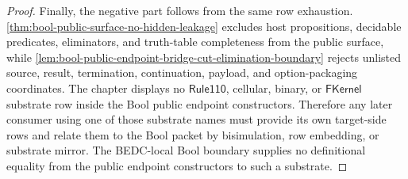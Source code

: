 \begin{proof}
Finally, the negative part follows from the same row exhaustion. \autoref{thm:bool-public-surface-no-hidden-leakage} excludes host propositions, decidable predicates, eliminators, and truth-table completeness from the public surface, while \autoref{lem:bool-public-endpoint-bridge-cut-elimination-boundary} rejects unlisted source, result, termination, continuation, payload, and option-packaging coordinates. The chapter displays no $\mathsf{Rule110}$, cellular, binary, or $\mathsf{FKernel}$ substrate row inside the Bool public endpoint constructors. Therefore any later consumer using one of those substrate names must provide its own target-side rows and relate them to the Bool packet by bisimulation, row embedding, or substrate mirror. The BEDC-local Bool boundary supplies no definitional equality from the public endpoint constructors to such a substrate.
\end{proof}
